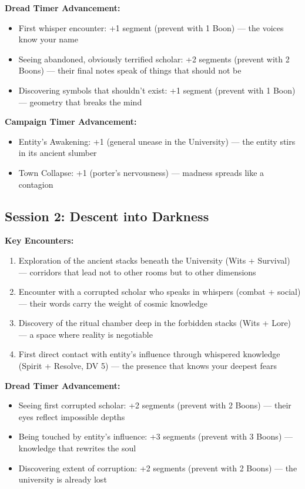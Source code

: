 \documentclass[11pt]{article}
\begin{document}
\textbf{Dread Timer Advancement:}
\begin{itemize}
\item First whisper encounter: +1 segment (prevent with 1 Boon) --- the voices know your name
\item Seeing abandoned, obviously terrified scholar: +2 segments (prevent with 2 Boons) --- their final notes speak of things that should not be
\item Discovering symbols that shouldn't exist: +1 segment (prevent with 1 Boon) --- geometry that breaks the mind
\end{itemize}

\textbf{Campaign Timer Advancement:}
\begin{itemize}
\item Entity's Awakening: +1 (general unease in the University) --- the entity stirs in its ancient slumber
\item Town Collapse: +1 (porter's nervousness) --- madness spreads like a contagion
\end{itemize}

\subsection{Session 2: Descent into Darkness}

\textbf{Key Encounters:}
\begin{enumerate}
\item Exploration of the ancient stacks beneath the University (Wits + Survival) --- corridors that lead not to other rooms but to other dimensions
\item Encounter with a corrupted scholar who speaks in whispers (combat + social) --- their words carry the weight of cosmic knowledge
\item Discovery of the ritual chamber deep in the forbidden stacks (Wits + Lore) --- a space where reality is negotiable
\item First direct contact with entity's influence through whispered knowledge (Spirit + Resolve, DV 5) --- the presence that knows your deepest fears
\end{enumerate}

\textbf{Dread Timer Advancement:}
\begin{itemize}
\item Seeing first corrupted scholar: +2 segments (prevent with 2 Boons) --- their eyes reflect impossible depths
\item Being touched by entity's influence: +3 segments (prevent with 3 Boons) --- knowledge that rewrites the soul
\item Discovering extent of corruption: +2 segments (prevent with 2 Boons) --- the university is already lost
\end{itemize}
\end{document}
